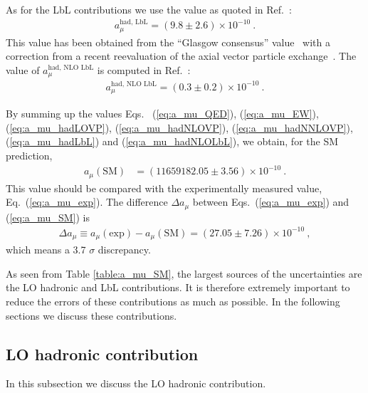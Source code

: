 As for the LbL contributions we use the value
as quoted in Ref.~\cite{KNT18}: 
%
%
\begin{align}
a_\mu^{\text{had, LbL}}= (9.8 \pm 2.6) \times 10^{-10}~.
\label{eq:a_mu_hadLbL}
\end{align}
%
This value has been obtained from the ``Glasgow consensus''
value~\cite{} with a correction from a recent reevaluation
of the axial vector particle exchange~\cite{}.
The value of $a_\mu^{\text{had, NLO LbL}}$ is computed
in Ref.~\cite{Colangelo-etal-NLOLbL}:
%
\begin{align}
a_\mu^{\text{had, NLO LbL}}= (0.3 \pm 0.2) \times 10^{-10}~.
\label{eq:a_mu_hadNLOLbL}
\end{align}

By summing up the values Eqs.~
(\ref{eq:a_mu_QED}), (\ref{eq:a_mu_EW}), (\ref{eq:a_mu_hadLOVP}),
(\ref{eq:a_mu_hadNLOVP}), (\ref{eq:a_mu_hadNNLOVP}),
(\ref{eq:a_mu_hadLbL}) and (\ref{eq:a_mu_hadNLOLbL}), 
we obtain, for the SM prediction, 
%
\begin{align}
 a_\mu(\text{SM}) &= (11 659 182.05 \pm 3.56) \times 10^{-10}~.
\label{eq:a_mu_SM}
\end{align}
%
This value should be compared with the experimentally measured
value, Eq.~(\ref{eq:a_mu_exp}).
The difference $\Delta a_\mu$ between Eqs.~(\ref{eq:a_mu_exp})
and (\ref{eq:a_mu_SM}) is
% 
\begin{align}
 \Delta a_\mu \equiv a_\mu(\text{exp}) - a_\mu(\text{SM})
= (27.05 \pm 7.26) \times 10^{-10}~,
\label{eq:delta_a_mu}
\end{align}
%
which means a 3.7 $\sigma$ discrepancy.

As seen from Table \ref{table:a_mu_SM}, 
the largest sources of the uncertainties are the
LO hadronic and LbL contributions.  It is therefore
extremely important to reduce the errors of these contributions
as much as possible.
In the following sections we discuss these contributions.

\subsection{LO hadronic contribution}

In this subsection we discuss the LO hadronic contribution.

